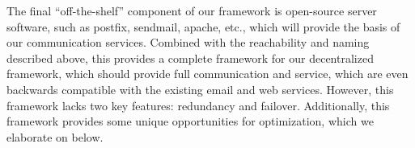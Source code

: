 The final "`off-the-shelf"' component of our framework is open-source server software, such as postfix, sendmail, apache, etc., which will provide the basis of our communication services.
Combined with the reachability and naming described above, this provides a complete framework for our decentralized framework, which should provide full communication and service, which are even backwards compatible with the existing email and web services.
However, this framework lacks two key features: redundancy and failover.
Additionally, this framework provides some unique opportunities for optimization, which we elaborate on below.

